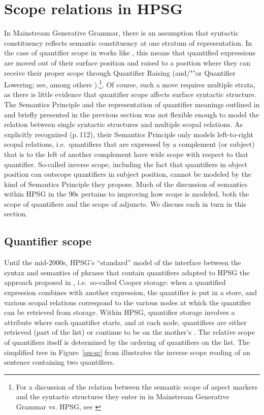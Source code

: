 \documentclass[output=paper
 	        ,biblatex
                ,babelshorthands
                ,newtxmath
                ,draftmode
                ,colorlinks, citecolor=brown
]{langscibook}
\begin{document}
\section{Scope relations in HPSG}
\label{sec-scope-in-hpsg}

In Mainstream Generative Grammar, there is an assumption that syntactic constituency reflects semantic constituency at one stratum of representation. In the case of quantifier scope in works like \citet{May1985}, this means that quantified expressions are moved out of their surface position and raised to a position where they can receive their proper scope through Quantifier Raising (and/""or Quantifier Lowering; see, among others \citealt{Hornstein1995}).\footnote{For a discussion of the relation between the semantic scope of aspect markers and the syntactic structures they enter in in Mainstream Generative Grammar vs. HPSG, see \citet{KoenigandMuansuwan2005}}. Of course, such a move requires multiple strata, as there is little evidence that quantifier scope affects surface syntactic structure. The Semantics Principle and the representation of quantifier meanings outlined in \citet{PollardandSag1987} and briefly presented in the previous section was not flexible enough to model the relation between single syntactic structures and multiple scopal relations. As \citeauthor{PollardandSag1987} explicitly recognized (p.\,112), their Semantics Principle only models left-to-right scopal relations, i.e.\ quantifiers that are expressed by a complement (or subject) that is to the left of another complement have wide scope with respect to that quantifier. So-called inverse scope, including the fact that quantifiers in object position can outscope quantifiers in subject position, cannot be modeled by the kind of Semantics Principle they propose. Much of the discussion of semantics within HPSG in the 90s pertains to improving how scope is modeled, both the scope of quantifiers and the scope of adjuncts. We discuss each in turn in this section.


\subsection{Quantifier scope}

Until the mid-2000s, HPSG's ``standard'' model of the interface between the syntax and semantics of phrases that contain quantifiers adapted to HPSG the approach proposed in \citet{Cooper1975,Cooper1983}, i.e.\ so-called Cooper storage: when a quantified expression combines with another expression, the quantifier is put in a store, and various scopal relations correspond to the various nodes at which the quantifier can be retrieved from storage. Within HPSG, quantifier storage involves a  attribute where each quantifier starts, and at each node, quantifiers are either retrieved (part of the  list) or continue to be on the mother's . The relative scope of quantifiers itself is determined by the ordering of quantifiers on the  list. The simplified tree in Figure~\ref{qu-sc} from \citet[324]{PollardandSag1994} illustrates the inverse scope reading of an  sentence containing two quantifiers.
\end{document}
